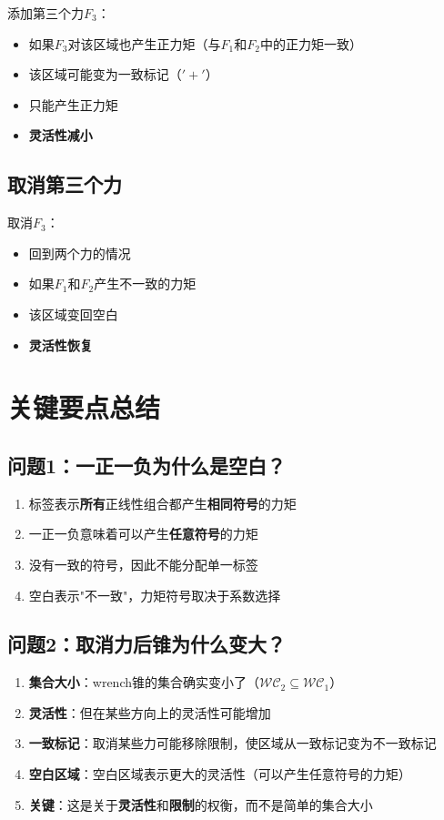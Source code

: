 \documentclass[12pt,a4paper]{article}
\begin{document}
添加第三个力$F_3$：

\begin{itemize}
    \item 如果$F_3$对该区域也产生正力矩（与$F_1$和$F_2$中的正力矩一致）
    \item 该区域可能变为一致标记（$'+'$）
    \item 只能产生正力矩
    \item \textbf{灵活性减小}
\end{itemize}

\subsection{取消第三个力}

取消$F_3$：

\begin{itemize}
    \item 回到两个力的情况
    \item 如果$F_1$和$F_2$产生不一致的力矩
    \item 该区域变回空白
    \item \textbf{灵活性恢复}
\end{itemize}

\section{关键要点总结}

\subsection{问题1：一正一负为什么是空白？}

\begin{enumerate}
    \item 标签表示\textbf{所有}正线性组合都产生\textbf{相同符号}的力矩
    \item 一正一负意味着可以产生\textbf{任意符号}的力矩
    \item 没有一致的符号，因此不能分配单一标签
    \item 空白表示"不一致"，力矩符号取决于系数选择
\end{enumerate}

\subsection{问题2：取消力后锥为什么变大？}

\begin{enumerate}
    \item \textbf{集合大小}：wrench锥的集合确实变小了（$\mathcal{WC}_2 \subseteq \mathcal{WC}_1$）
    \item \textbf{灵活性}：但在某些方向上的灵活性可能增加
    \item \textbf{一致标记}：取消某些力可能移除限制，使区域从一致标记变为不一致标记
    \item \textbf{空白区域}：空白区域表示更大的灵活性（可以产生任意符号的力矩）
    \item \textbf{关键}：这是关于\textbf{灵活性}和\textbf{限制}的权衡，而不是简单的集合大小
\end{enumerate}
\end{document}
